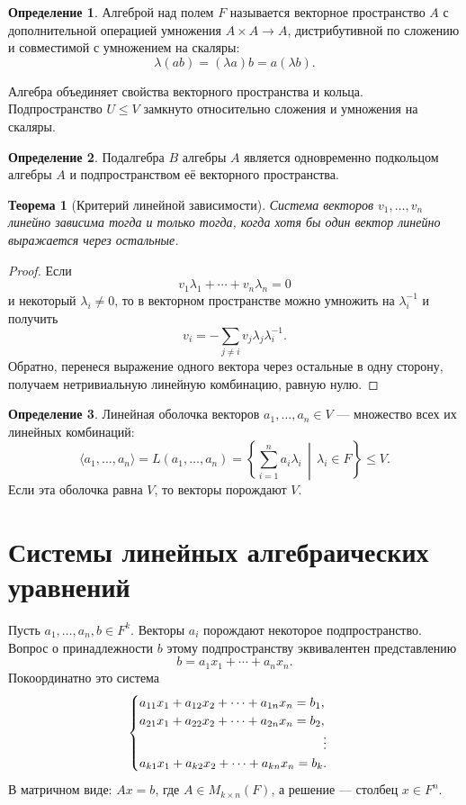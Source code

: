 \documentclass[12pt,a4paper,oneside,openany]{book}
\theoremstyle{definition}
\newtheorem{definition}{Определение}[chapter]
\theoremstyle{plain}
\newtheorem{theorem}{Теорема}[chapter]
\theoremstyle{remark}
\begin{document}
\begin{definition}
Алгеброй над полем $F$ называется векторное пространство $A$ с
дополнительной операцией умножения $A\times A\to A$, дистрибутивной по
сложению и совместимой с умножением на скаляры:
\[
  \lambda(ab)=(\lambda a)b=a(\lambda b).
\]
\end{definition}

Алгебра объединяет свойства векторного пространства и кольца. Подпространство
$U\leq V$ замкнуто относительно сложения и умножения на скаляры.

\begin{definition}
Подалгебра $B$ алгебры $A$ является одновременно подкольцом алгебры $A$
и подпространством её векторного пространства.
\end{definition}


\begin{theorem}[Критерий линейной зависимости]
Система векторов $v_1,\ldots,v_n$ линейно зависима тогда и только тогда,
когда хотя бы один вектор линейно выражается через остальные.
\end{theorem}

\begin{proof}
Если
\[
  v_1\lambda_1+\cdots+v_n\lambda_n=0
\]
и некоторый $\lambda_i\ne0$, то в векторном пространстве можно умножить
на $\lambda_i^{-1}$ и получить
\[
  v_i=-\sum_{j\ne i}v_j\lambda_j\lambda_i^{-1}.
\]
Обратно, перенеся выражение одного вектора через остальные в одну сторону,
получаем нетривиальную линейную комбинацию, равную нулю.
\end{proof}

\begin{definition}
Линейная оболочка векторов $a_1,\ldots,a_n\in V$ --- множество всех их
линейных комбинаций:
\[
  \langle a_1,\ldots,a_n\rangle
  =L(a_1,\ldots,a_n)
  =\left\{\sum_{i=1}^{n}a_i\lambda_i\,\middle|\,\lambda_i\in F\right\}
  \leq V.
\]
Если эта оболочка равна $V$, то векторы порождают $V$.
\end{definition}


\chapter{Системы линейных алгебраических уравнений}

Пусть $a_1,\ldots,a_n,b\in F^k$. Векторы $a_i$ порождают некоторое
подпространство. Вопрос о принадлежности $b$ этому подпространству
эквивалентен представлению
\[
  b=a_1x_1+\cdots+a_nx_n.
\]
Покоординатно это система
\[
\begin{cases}
a_{11}x_1+a_{12}x_2+\cdots+a_{1n}x_n=b_1,\\
a_{21}x_1+a_{22}x_2+\cdots+a_{2n}x_n=b_2,\\
\hfill\vdots\\
a_{k1}x_1+a_{k2}x_2+\cdots+a_{kn}x_n=b_k.
\end{cases}
\]
В матричном виде: $Ax=b$, где $A\in M_{k\times n}(F)$, а решение ---
столбец $x\in F^n$.
\end{document}
